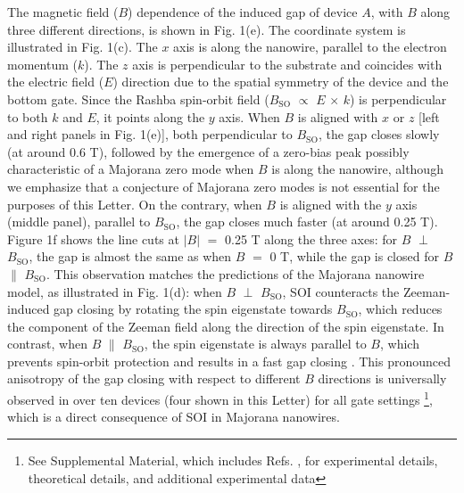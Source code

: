 The magnetic field ($B$) dependence of the induced gap of device $A$, with $B$ along three different directions, is shown in Fig. 1(e).
The coordinate system is illustrated in Fig. 1(c).
The $x$ axis is along the nanowire, parallel to the electron momentum ($k$).
The $z$ axis is perpendicular to the substrate and coincides with the electric field ($E$) direction due to the spatial symmetry of the device and the bottom gate.
Since the Rashba spin-orbit field ($B_{\mathrm{SO}}$ $\propto$ $E$ $\times$ $k$) is perpendicular to both $k$ and $E$, it points along the $y$ axis.
When $B$ is aligned with $x$ or $z$ [left and right panels in Fig. 1(e)], both perpendicular to $B_{\mathrm{SO}}$, the gap closes \mbox{slowly} (at around 0.6 T), followed by the emergence of a zero-bias peak possibly characteristic of a Majorana zero mode when $B$ is along the nanowire, although we emphasize that a conjecture of Majorana zero modes is not essential for the purposes of this Letter.
On the contrary, when $B$ is aligned with the $y$ axis (middle panel), parallel to $B_{\mathrm{SO}}$, the gap closes much faster (at around 0.25 T).
Figure 1f shows the line cuts at $|B|$ $=$ 0.25 T along the three axes: for $B$ $\perp$ $B_{\mathrm{SO}}$, the gap is almost the same as when $B$ $=$ 0 T, while the gap is closed for $B$ $\parallel$ $B_{\mathrm{SO}}$.
This observation matches the predictions of the Majorana nanowire model, as illustrated in Fig. 1(d): when $B$ $\perp$ $B_{\mathrm{SO}}$, SOI counteracts the Zeeman-induced gap closing by rotating the spin eigenstate towards $B_{\mathrm{SO}}$, which reduces the component of the Zeeman field along the direction of the spin eigenstate.
In contrast, when $B$ $\parallel$ $B_{\mathrm{SO}}$, the spin eigenstate is always parallel to $B$, which prevents spin-orbit protection and results in a fast gap closing \cite{Osca2014,Rex2014}.
This pronounced anisotropy of the gap closing with respect to different $B$ directions is universally observed in over ten devices (four shown in this Letter) for all gate settings
\footnote{See Supplemental Material, which includes Refs.
 \cite{Car2014,Flohr2011,Suyatin2007,HardGap,Liu2017,Danon2017,Hofstader1976,Gropp1996,Du1999,Prada2012,Pientka2012,Stanescu2012}, for experimental details, theoretical details, and additional experimental data}, which is a direct consequence of SOI in Majorana nanowires.
\nocite{Car2014,Flohr2011,Suyatin2007,HardGap,Liu2017,Danon2017,Hofstader1976,Gropp1996,Du1999,Prada2012,Pientka2012,Stanescu2012}

